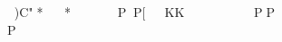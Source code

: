 )C"**	PP[			KK%

%
PP		%

	P%



